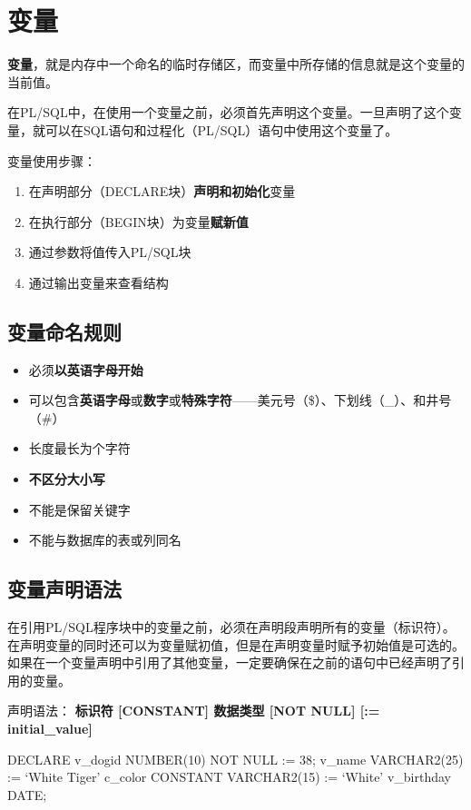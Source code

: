 \documentclass[11pt, a4paper, oneside, UTF8]{ctexbook}
\let\kaishu\relax %
\begin{document}
\chapter{变量}
 {\bfseries\kaishu 变量}，就是内存中一个命名的临时存储区，而变量中所存储的信息就是这个变量的当前值。

在PL/SQL中，在使用一个变量之前，必须首先声明这个变量。一旦声明了这个变量，就可以在SQL语句和过程化（PL/SQL）语句中使用这个变量了。

变量使用步骤：
\begin{enumerate}
  \item 在声明部分（DECLARE块）\textbf{声明和初始化}变量
  \item 在执行部分（BEGIN块）为变量\textbf{赋新值}
  \item 通过参数将值传入PL/SQL块
  \item 通过输出变量来查看结构
\end{enumerate}
\section{变量命名规则}
\begin{itemize}
  \item 必须{\bfseries\kaishu 以英语字母开始}
  \item 可以包含{\bfseries\kaishu 英语字母}或{\bfseries\kaishu 数字}或{\bfseries\kaishu 特殊字符}——美元号（\$）、下划线（\_）、和井号（\#）
  \item 长度最长为{\bfseries\kaishu 30}个字符
  \item {\bfseries\kaishu 不区分大小写}
  \item 不能是保留关键字
  \item 不能与数据库的表或列同名
\end{itemize}
\section{变量声明语法}
在引用PL/SQL程序块中的变量之前，必须在声明段声明所有的变量（标识符）。
在声明变量的同时还可以为变量赋初值，但是在声明变量时赋予初始值是可选的。
如果在一个变量声明中引用了其他变量，一定要确保在之前的语句中已经声明了引用的变量。

声明语法：
{\bfseries\kaishu 标识符 [CONSTANT] 数据类型 [NOT NULL] [:= initial\_value]}

\begin{plsql}[caption=PL/SQL变量声明语法示例]
  DECLARE
  v_dogid NUMBER(10) NOT NULL := 38;
  v_name VARCHAR2(25) := ‘White Tiger’
  c_color CONSTANT VARCHAR2(15) := ‘White’
  v_birthday DATE;
\end{plsql}
\end{document}

